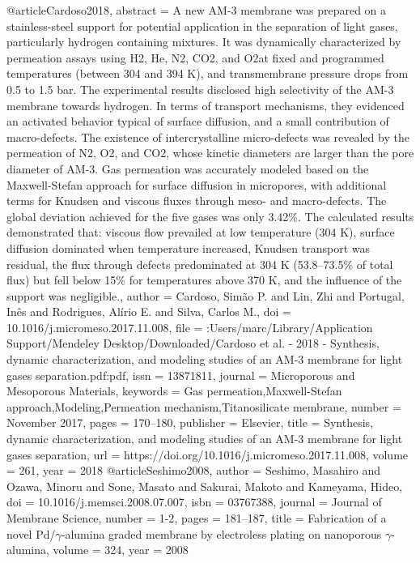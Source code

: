 @article{Cardoso2018,
abstract = {A new AM-3 membrane was prepared on a stainless-steel support for potential application in the separation of light gases, particularly hydrogen containing mixtures. It was dynamically characterized by permeation assays using H2, He, N2, CO2, and O2at fixed and programmed temperatures (between 304 and 394 K), and transmembrane pressure drops from 0.5 to 1.5 bar. The experimental results disclosed high selectivity of the AM-3 membrane towards hydrogen. In terms of transport mechanisms, they evidenced an activated behavior typical of surface diffusion, and a small contribution of macro-defects. The existence of intercrystalline micro-defects was revealed by the permeation of N2, O2, and CO2, whose kinetic diameters are larger than the pore diameter of AM-3. Gas permeation was accurately modeled based on the Maxwell-Stefan approach for surface diffusion in micropores, with additional terms for Knudsen and viscous fluxes through meso- and macro-defects. The global deviation achieved for the five gases was only 3.42{\%}. The calculated results demonstrated that: viscous flow prevailed at low temperature (304 K), surface diffusion dominated when temperature increased, Knudsen transport was residual, the flux through defects predominated at 304 K (53.8–73.5{\%} of total flux) but fell below 15{\%} for temperatures above 370 K, and the influence of the support was negligible.},
author = {Cardoso, Sim{\~{a}}o P. and Lin, Zhi and Portugal, In{\^{e}}s and Rodrigues, Al{\'{i}}rio E. and Silva, Carlos M.},
doi = {10.1016/j.micromeso.2017.11.008},
file = {:Users/marc/Library/Application Support/Mendeley Desktop/Downloaded/Cardoso et al. - 2018 - Synthesis, dynamic characterization, and modeling studies of an AM-3 membrane for light gases separation.pdf:pdf},
issn = {13871811},
journal = {Microporous and Mesoporous Materials},
keywords = {Gas permeation,Maxwell-Stefan approach,Modeling,Permeation mechanism,Titanosilicate membrane},
number = {November 2017},
pages = {170--180},
publisher = {Elsevier},
title = {{Synthesis, dynamic characterization, and modeling studies of an AM-3 membrane for light gases separation}},
url = {https://doi.org/10.1016/j.micromeso.2017.11.008},
volume = {261},
year = {2018}
}
@article{Seshimo2008,
author = {Seshimo, Masahiro and Ozawa, Minoru and Sone, Masato and Sakurai, Makoto and Kameyama, Hideo},
doi = {10.1016/j.memsci.2008.07.007},
isbn = {03767388},
journal = {Journal of Membrane Science},
number = {1-2},
pages = {181--187},
title = {{Fabrication of a novel Pd/$\gamma$-alumina graded membrane by electroless plating on nanoporous $\gamma$-alumina}},
volume = {324},
year = {2008}
}
